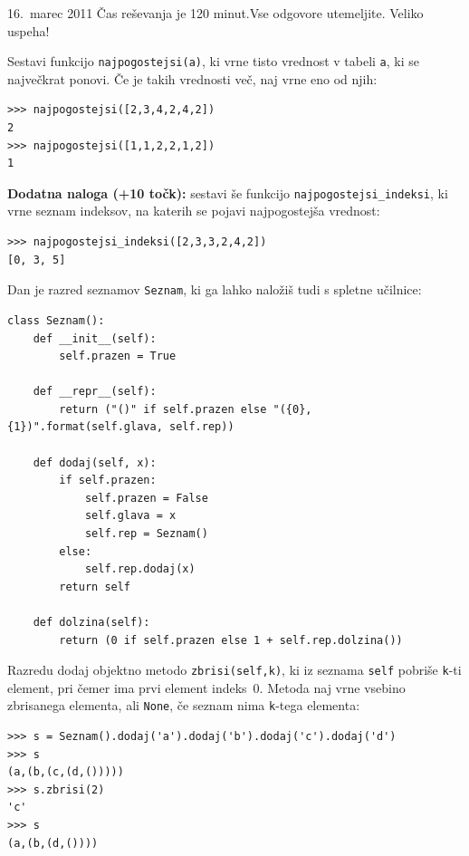\documentclass[arhiv]{izpit}
\begin{document}
  {16.~marec 2011}
  {Čas reševanja je 120 minut.Vse odgovore utemeljite. Veliko uspeha!}

\naloga[\tocke{25}]

\podnaloga
%
Sestavi funkcijo \texttt{najpogostejsi(a)}, ki vrne tisto vrednost v
tabeli \texttt{a}, ki se največkrat ponovi. Če je takih vrednosti več,
naj vrne eno od njih:
%
\begin{verbatim}
>>> najpogostejsi([2,3,4,2,4,2])
2
>>> najpogostejsi([1,1,2,2,1,2])
1
\end{verbatim}

\podnaloga
\textbf{Dodatna naloga (+10 točk):}
%
sestavi še funkcijo \texttt{najpogostejsi\_indeksi}, ki vrne seznam
indeksov, na katerih se pojavi najpogostejša vrednost:
%
\begin{verbatim}
>>> najpogostejsi_indeksi([2,3,3,2,4,2])
[0, 3, 5]
\end{verbatim}


\naloga[\tocke{25}]

Dan je razred seznamov \texttt{Seznam}, ki ga lahko naložiš tudi s
spletne učilnice:
%
{\small
\begin{verbatim}
class Seznam():
    def __init__(self):
        self.prazen = True

    def __repr__(self):
        return ("()" if self.prazen else "({0},{1})".format(self.glava, self.rep))

    def dodaj(self, x):
        if self.prazen:
            self.prazen = False
            self.glava = x
            self.rep = Seznam()
        else:
            self.rep.dodaj(x)
        return self

    def dolzina(self):
        return (0 if self.prazen else 1 + self.rep.dolzina())
\end{verbatim}
}

\noindent
Razredu dodaj objektno metodo \texttt{zbrisi(self,k)}, ki iz seznama
\texttt{self} pobriše \texttt{k}-ti element, pri čemer ima prvi
element indeks~$0$. Metoda naj vrne vsebino zbrisanega elementa, ali
\texttt{None}, če seznam nima \texttt{k}-tega elementa:
%
\begin{verbatim}
>>> s = Seznam().dodaj('a').dodaj('b').dodaj('c').dodaj('d')
>>> s
(a,(b,(c,(d,()))))
>>> s.zbrisi(2)
'c'
>>> s
(a,(b,(d,())))
\end{verbatim}
\end{document}
